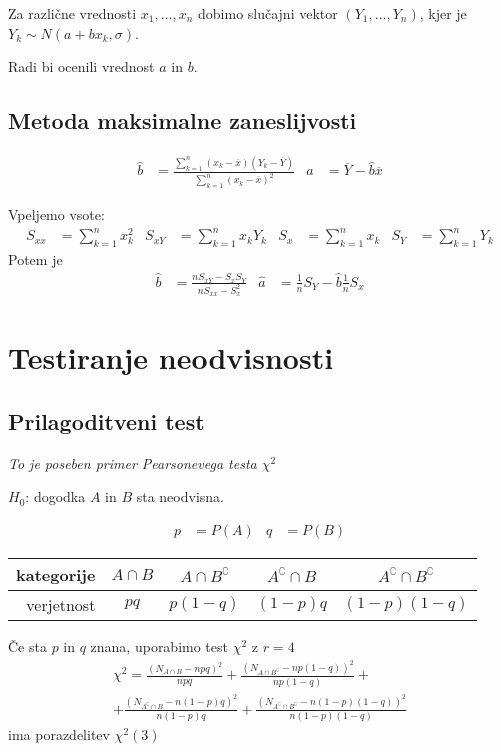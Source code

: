 \begin{multicols}{5}
Za različne vrednosti $x_1, \dots, x_n$ dobimo slučajni vektor $(Y_1, \dots, Y_n)$, kjer je $Y_k \sim N(a+bx_k, \sigma)$.

Radi bi ocenili vrednost $a$ in $b$.

\subsection{Metoda maksimalne zaneslijvosti}
\begin{align*}
    \hat{b} &= \frac{\sum_{k=1}^n (x_k - \overline{x})(Y_k - \overline{Y})}{\sum_{k=1}^n (x_k - \overline{x})^2} &
    \hat{a} &= \overline{Y} - \hat{b}\overline{x}
\end{align*}

Vpeljemo vsote:
{\small
\begin{align*}
    S_{xx} &= \sum_{k=1}^n x_k^2 &
    S_{xY} &= \sum_{k=1}^n x_k Y_k &
    S_{x} &= \sum_{k=1}^n x_k &
    S_{Y} &= \sum_{k=1}^n Y_k
\end{align*}}
Potem je
\begin{align*}
    \hat{b} &= \frac{n S_{xY} - S_x S_Y}{nS_{xx} - S_x^2} &
    \hat{a} &= \frac{1}{n} S_Y - \hat{b} \frac{1}{n} S_x
\end{align*}


\section{Testiranje neodvisnosti}
\subsection{Prilagoditveni test}
\textit{To je poseben primer Pearsonevega testa $\chi^2$}

$H_0$: dogodka $A$ in $B$ sta neodvisna.

\begin{align*}
    p &= P(A) &  q &= P(B)
\end{align*}
\begin{center}
    \begin{tabular}{r | c c c c}
        kategorije & $A \cap B$ & $A \cap B^\complement$ & $A^\complement \cap B$ & $A^\complement \cap B^\complement$ \\ \hline
        verjetnost & $pq$ & $p(1-q)$ & $(1-p)q$ & $(1-p)(1-q)$
    \end{tabular}
\end{center}

Če sta $p$ in $q$ znana, uporabimo test $\chi^2$ z $r = 4$
{\small
\begin{multline*}
    \chi^2 = \frac{(N_{A \cap B} - npq)^2}{npq} + \frac{(N_{A \cap B^\complement} - np(1-q))^2}{np(1-q)} + \\ + \frac{(N_{A^\complement \cap B} - n(1-p)q)^2}{n(1-p)q} + \frac{(N_{A^\complement \cap B^\complement} - n(1-p)(1-q))^2}{n(1-p)(1-q)}
\end{multline*}}
ima porazdelitev $\chi^2(3)$


\end{multicols}
